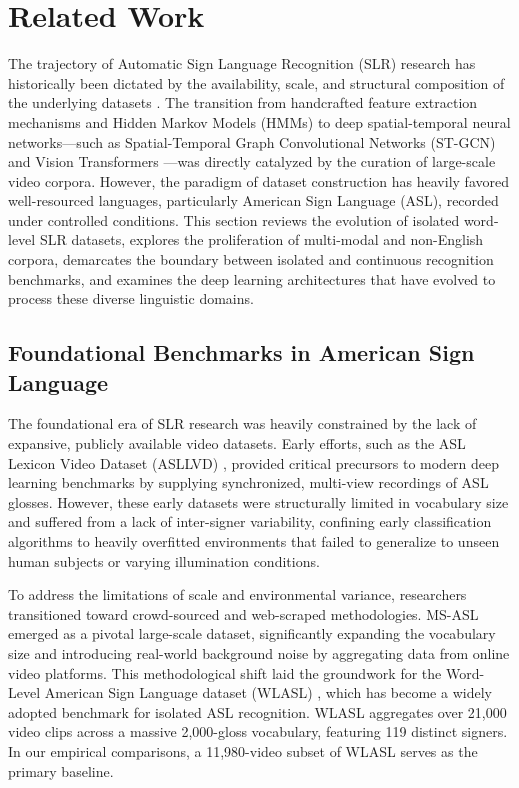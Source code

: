 \documentclass{ieeeaccess}
\begin{document}
\section{Related Work} \label{sec:related}

The trajectory of Automatic Sign Language Recognition (SLR) research has historically been dictated by the availability, scale, and structural composition of the underlying datasets \cite{rastgoo2021sign}. The transition from handcrafted feature extraction mechanisms and Hidden Markov Models (HMMs) to deep spatial-temporal neural networks—such as Spatial-Temporal Graph Convolutional Networks (ST-GCN) \cite{jiang2021skeleton} and Vision Transformers \cite{camgoz2020sign}—was directly catalyzed by the curation of large-scale video corpora. However, the paradigm of dataset construction has heavily favored well-resourced languages, particularly American Sign Language (ASL), recorded under controlled conditions. This section reviews the evolution of isolated word-level SLR datasets, explores the proliferation of multi-modal and non-English corpora, demarcates the boundary between isolated and continuous recognition benchmarks, and examines the deep learning architectures that have evolved to process these diverse linguistic domains.

\subsection{Foundational Benchmarks in American Sign Language}
The foundational era of SLR research was heavily constrained by the lack of expansive, publicly available video datasets. Early efforts, such as the ASL Lexicon Video Dataset (ASLLVD) \cite{neidle2012asllvd}, provided critical precursors to modern deep learning benchmarks by supplying synchronized, multi-view recordings of ASL glosses. However, these early datasets were structurally limited in vocabulary size and suffered from a lack of inter-signer variability, confining early classification algorithms to heavily overfitted environments that failed to generalize to unseen human subjects or varying illumination conditions. 

To address the limitations of scale and environmental variance, researchers transitioned toward crowd-sourced and web-scraped methodologies. MS-ASL \cite{joze2019msasl} emerged as a pivotal large-scale dataset, significantly expanding the vocabulary size and introducing real-world background noise by aggregating data from online video platforms. This methodological shift laid the groundwork for the Word-Level American Sign Language dataset (WLASL) \cite{li2020wlasl}, which has become a widely adopted benchmark for isolated ASL recognition. WLASL aggregates over 21,000 video clips across a massive 2,000-gloss vocabulary, featuring 119 distinct signers. In our empirical comparisons, a 11,980-video subset of WLASL serves as the primary baseline.
\end{document}
